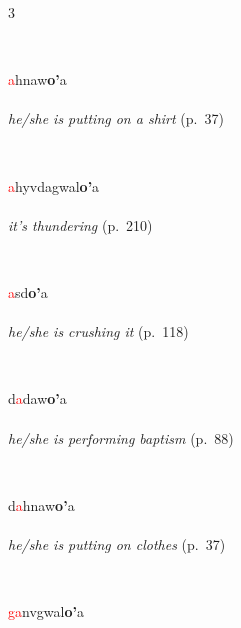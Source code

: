 \documentclass[oneside,openany]{book}%
\begin{document}
\begin{multicols}{3}
\begin{minipage}[t]{\linewidth}
\end{minipage}\\[1em]%
\begin{minipage}[t]{\linewidth}
\raggedright\noindent \textcolor{Red}{a}hnaw\textbf{o'}a\\
\\
\noindent \textit{he/she is putting on a shirt} (p.~37)
\end{minipage}\\[1em]%
\begin{minipage}[t]{\linewidth}
\raggedright\noindent \textcolor{Red}{a}hyvdagwal\textbf{o'}a\\
\\
\noindent \textit{it's thundering} (p.~210)
\end{minipage}\\[1em]%
\begin{minipage}[t]{\linewidth}
\raggedright\noindent \textcolor{Red}{a}sd\textbf{o'}a\\
\\
\noindent \textit{he/she is crushing it} (p.~118)
\end{minipage}\\[1em]%
\begin{minipage}[t]{\linewidth}
\raggedright\noindent d\textcolor{Red}{a}daw\textbf{o'}a\\
\\
\noindent \textit{he/she is performing baptism} (p.~88)
\end{minipage}\\[1em]%
\begin{minipage}[t]{\linewidth}
\raggedright\noindent d\textcolor{Red}{a}hnaw\textbf{o'}a\\
\\
\noindent \textit{he/she is putting on clothes} (p.~37)
\end{minipage}\\[1em]%
\begin{minipage}[t]{\linewidth}
\raggedright\noindent \textcolor{Red}{ga}nvgwal\textbf{o'}a\\
\\

\end{minipage}
\end{multicols}
\end{document}
